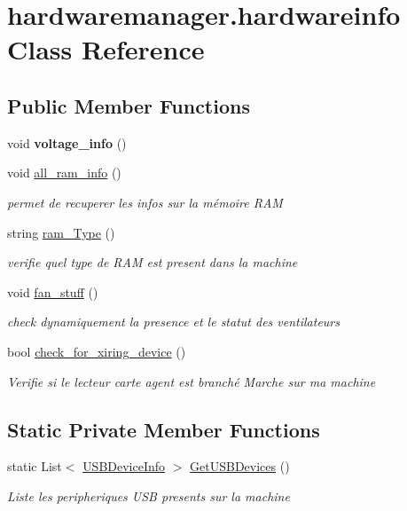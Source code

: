 \hypertarget{classhardwaremanager_1_1hardwareinfo}{}\section{hardwaremanager.\+hardwareinfo Class Reference}
\label{classhardwaremanager_1_1hardwareinfo}
\subsection*{Public Member Functions}
\begin{DoxyCompactItemize}
\item 
\mbox{\label{classhardwaremanager_1_1hardwareinfo_a663db24b64288e941d0df719b77c0e58}} 
void {\bfseries voltage\+\_\+info} ()
\item 
void \hyperlink{classhardwaremanager_1_1hardwareinfo_a1752d83d9f8c32ae3f4e3961d3a5f991}{all\+\_\+ram\+\_\+info} ()
\begin{DoxyCompactList}\small\item\em permet de recuperer les infos sur la mémoire R\+AM \end{DoxyCompactList}\item 
string \hyperlink{classhardwaremanager_1_1hardwareinfo_af9c922475681b3b40c53ad13f5556ad1}{ram\+\_\+\+Type} ()
\begin{DoxyCompactList}\small\item\em verifie quel type de R\+AM est present dans la machine \end{DoxyCompactList}\item 
void \hyperlink{classhardwaremanager_1_1hardwareinfo_ac15b4493df355c3b406f9bfd0c0e2671}{fan\+\_\+stuff} ()
\begin{DoxyCompactList}\small\item\em check dynamiquement la presence et le statut des ventilateurs \end{DoxyCompactList}\item 
bool \hyperlink{classhardwaremanager_1_1hardwareinfo_af1347f901af8c5f3dc2cca91fc5505cb}{check\+\_\+for\+\_\+xiring\+\_\+device} ()
\begin{DoxyCompactList}\small\item\em Verifie si le lecteur carte agent est branché Marche sur ma machine \end{DoxyCompactList}\end{DoxyCompactItemize}
\subsection*{Static Private Member Functions}
\begin{DoxyCompactItemize}
\item 
static List$<$ \hyperlink{classhardwaremanager_1_1_u_s_b_device_info}{U\+S\+B\+Device\+Info} $>$ \hyperlink{classhardwaremanager_1_1hardwareinfo_a23bffbb039851e238039b3f18f808efd}{Get\+U\+S\+B\+Devices} ()
\begin{DoxyCompactList}\small\item\em Liste les peripheriques U\+SB presents sur la machine \end{DoxyCompactList}\end{DoxyCompactItemize}
